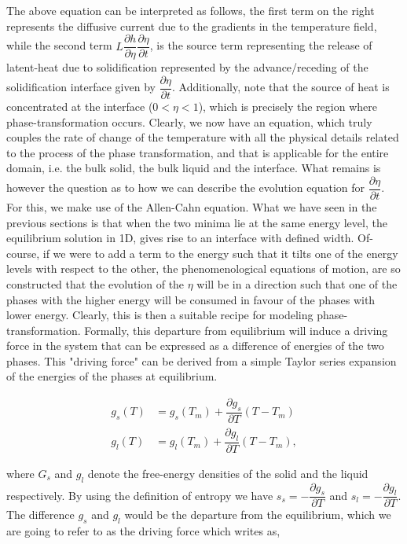 \documentclass[english]{iambook}
\begin{document}
The above equation can be interpreted as follows, the first term on the
right represents the diffusive current due to the gradients in the temperature
field, while the second term $L\dfrac{\partial h}{\partial \eta}\dfrac{\partial \eta}{\partial t}$,
is the source term representing the release of latent-heat due to solidification
represented by the advance/receding of the solidification interface 
given by $\dfrac{\partial \eta}{\partial t}$. Additionally, note that 
the source of heat is concentrated at the interface ($0 < \eta <1$), 
which is precisely the region where phase-transformation occurs.
Clearly, we now have an equation,
which truly couples the rate of change of the temperature with all the 
physical details related to the process of the phase transformation,
and that is applicable for the entire domain, i.e. the bulk solid, 
the bulk liquid and the interface.
What remains is however the question as to how we can describe the 
evolution equation for $\dfrac{\partial \eta}{\partial t}$.
For this, we make use of the Allen-Cahn equation. What we have 
seen in the previous sections is that when the two minima lie at the 
same energy level, the equilibrium solution in 1D, gives rise
to an interface with defined width. Of-course, if we were to add
a term to the energy such that it tilts one of the energy levels
with respect to the other, the phenomenological equations of motion, 
are so constructed that the evolution of the $\eta$ will be in a 
direction such that one of the phases with the higher energy will
be consumed in favour of the phases with lower energy. Clearly, 
this is then a suitable recipe for modeling phase-transformation. 
Formally, this departure from equilibrium will induce a driving 
force in the system that can be expressed as a difference of 
energies of the two phases. This "driving force" can be derived
from a simple Taylor series expansion of the energies of the 
phases at equilibrium.

\begin{align}
 g_s\left(T\right) &= g_s\left(T_m\right) + \dfrac{\partial g_s}{\partial T}\left(T-T_m\right)\\
 g_l\left(T\right) &= g_l\left(T_m\right) + \dfrac{\partial g_l}{\partial T}\left(T-T_m\right),
\end{align}

where $G_s$ and $g_l$ denote the free-energy densities of the solid and 
the liquid respectively. By using the definition of entropy we
have $s_s=-\dfrac{\partial g_s}{\partial T}$ and $s_l=-\dfrac{\partial g_l}{\partial T}$.
The difference $g_s$ and $g_l$ would be the departure from 
the equilibrium, which we are going to refer to as the driving 
force which writes as, 
\end{document}

